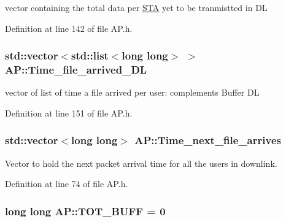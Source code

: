 vector containing the total data per \hyperlink{classSTA}{S\-T\-A} yet to be tranmistted in D\-L 



Definition at line 142 of file A\-P.\-h.

\hypertarget{classAP_a9d46a009bcda14f024fb046cd7d1e816}{
\subsubsection[{Time\-\_\-file\-\_\-arrived\-\_\-\-D\-L}]{\setlength{\rightskip}{0pt plus 5cm}std\-::vector$<$std\-::list$<$long long$>$ $>$ A\-P\-::\-Time\-\_\-file\-\_\-arrived\-\_\-\-D\-L}}\label{classAP_a9d46a009bcda14f024fb046cd7d1e816}


vector of list of time a file arrived per user\-: complements Buffer D\-L 



Definition at line 151 of file A\-P.\-h.

\hypertarget{classAP_a21b0b1203a2a7701c66b6c5a803b0160}{
\subsubsection[{Time\-\_\-next\-\_\-file\-\_\-arrives}]{\setlength{\rightskip}{0pt plus 5cm}std\-::vector$<$long long$>$ A\-P\-::\-Time\-\_\-next\-\_\-file\-\_\-arrives\hspace{0.3cm}{\ttfamily [private]}}}\label{classAP_a21b0b1203a2a7701c66b6c5a803b0160}


Vector to hold the next packet arrival time for all the users in downlink. 



Definition at line 74 of file A\-P.\-h.

\hypertarget{classAP_a03aea575eb6665fe9498fd30352e1d35}{
\subsubsection[{T\-O\-T\-\_\-\-B\-U\-F\-F}]{\setlength{\rightskip}{0pt plus 5cm}long long A\-P\-::\-T\-O\-T\-\_\-\-B\-U\-F\-F = 0}}\label{classAP_a03aea575eb6665fe9498fd30352e1d35}


